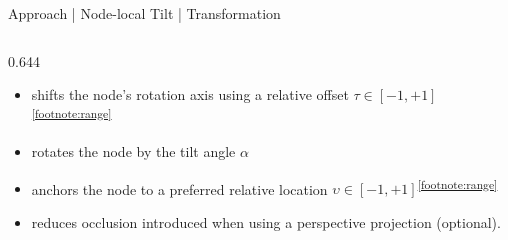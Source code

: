 \documentclass[aspectratio=169,10pt,english]{beamer}
\begin{document}
\begin{frame}[t]{Approach | Node-local Tilt | Transformation}


    \bigskip

    \begin{columns}

        \begin{column}{0.644\textwidth}

            \begin{itemize}
                \Large
                \normalsize
                \bigskip
                \bigskip

                \pause
                \item[$T_R$] shifts the node's rotation axis using a relative offset $\tau\in\left[-1,+1\right]$\textsuperscript{\ref{footnote:range}}

                \pause
                \item [$R$] rotates the node by the tilt angle $\alpha$

                \pause
                \pause
                \item [$T_A$] anchors the node to a preferred relative location $\upsilon\in\left[-1,+1\right]$\textsuperscript{\ref{footnote:range}}

                \pause
                \item [$T_C$] reduces occlusion introduced when using a perspective projection (optional).
            \end{itemize}

            \bigskip


\end{column}
\end{columns}
\end{frame}
\end{document}
